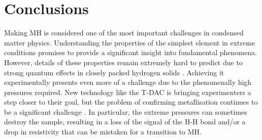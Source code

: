 \documentclass[esp]{FCEFyN-class}
\begin{document}




\vspace{10mm} %
\section{Conclusions}
\vspace{3mm} %
Making MH is considered one of the most important challenges in condensed matter physics. Understanding the properties of the simplest element in extreme conditions promises to provide a significant insight into fundamental phenomena. However, details of these properties remain extremely hard to predict due to strong quantum effects in closely packed hydrogen solids \cite{loubeyre2020}. Achieving it experimentally presents even more of a challenge due to the phenomenally high pressures required. New technology like the T-DAC is bringing experimenters a step closer to their goal, but the problem of confirming metallisation continues to be a significant challenge \cite{LoubeyreTDAC}. In particular, the extreme pressures can sometimes destroy the sample, resulting in a loss of the signal of the H-H bond and/or a drop in resistivity that can be mistaken for a transition to MH.
\end{document}
